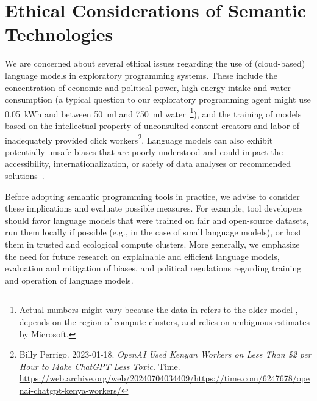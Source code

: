 
\section{Ethical Considerations of Semantic Technologies}
\label{sec:discussion/ethics}

We are concerned about several ethical issues regarding the use of (cloud-based) language models in exploratory programming systems.
These include the concentration of economic and political power, high energy intake and water consumption (a typical question to our exploratory programming agent might use \qty{0.05}{kWh} and between \qty{50}{ml} and \qty{750}{ml} water~\cite{li2023making}\footnote{%
	Actual numbers might vary because the data in \cite{li2023making} refers to the older model \gptthree, depends on the region of compute clusters, and relies on ambiguous estimates by Microsoft.
}), and the training of models based on the intellectual property of unconsulted content creators and labor of inadequately provided click workers\footnote{%
	Billy Perrigo.
	2023-01-18.
	\emph{OpenAI Used Kenyan Workers on Less Than \$2 per Hour to Make ChatGPT Less Toxic.}
	Time.
	\url{https://web.archive.org/web/20240704034409/https://time.com/6247678/openai-chatgpt-kenya-workers/}%
}.
Language models can also exhibit potentially unsafe biases that are poorly understood and could impact the accessibility, internationalization, or safety of data analyses or recommended solutions~\cite{openai2024gpt4}.

Before adopting semantic programming tools in practice, we advise to consider these implications and evaluate possible measures.
For example, tool developers should favor language models that were trained on fair and open-source datasets, run them locally if possible (e.g., in the case of small language models), or host them in trusted and ecological compute clusters.
More generally, we emphasize the need for future research on explainable and efficient language models, evaluation and mitigation of biases, and political regulations regarding training and operation of language models.
